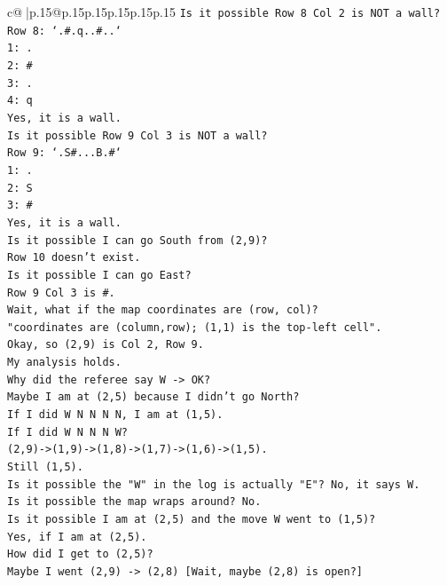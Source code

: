 \documentclass{article}
\begin{document}
{\begin{supertabular}{c@{$\;$}|p{.15\linewidth}@{}p{.15\linewidth}p{.15\linewidth}p{.15\linewidth}p{.15\linewidth}p{.15\linewidth}}
{{{\texttt{Is it possible Row 8 Col 2 is NOT a wall?} \\
\texttt{Row 8: `.\#.q..\#..`} \\
\texttt{1: .} \\
\texttt{2: \#} \\
\texttt{3: .} \\
\texttt{4: q} \\
\texttt{Yes, it is a wall.} \\
\texttt{Is it possible Row 9 Col 3 is NOT a wall?} \\
\texttt{Row 9: `.S\#...B.\#`} \\
\texttt{1: .} \\
\texttt{2: S} \\
\texttt{3: \#} \\
\texttt{Yes, it is a wall.} \\
\texttt{Is it possible I can go South from (2,9)?} \\
\texttt{Row 10 doesn't exist.} \\
\texttt{Is it possible I can go East?} \\
\texttt{Row 9 Col 3 is \#.} \\
\texttt{Wait, what if the map coordinates are (row, col)?} \\
\texttt{"coordinates are (column,row); (1,1) is the top{-}left cell".} \\
\texttt{Okay, so (2,9) is Col 2, Row 9.} \\
\texttt{My analysis holds.} \\
\texttt{Why did the referee say W {-}> OK?} \\
\texttt{Maybe I am at (2,5) because I didn't go North?} \\
\texttt{If I did W N N N N, I am at (1,5).} \\
\texttt{If I did W N N N W?} \\
\texttt{(2,9){-}>(1,9){-}>(1,8){-}>(1,7){-}>(1,6){-}>(1,5).} \\
\texttt{Still (1,5).} \\
\texttt{Is it possible the "W" in the log is actually "E"? No, it says W.} \\
\texttt{Is it possible the map wraps around? No.} \\
\texttt{Is it possible I am at (2,5) and the move W went to (1,5)?} \\
\texttt{Yes, if I am at (2,5).} \\
\texttt{How did I get to (2,5)?} \\
\texttt{Maybe I went (2,9) {-}> (2,8) {[}Wait, maybe (2,8) is open?{]}} \\
}}}
\end{supertabular}}
\end{document}
